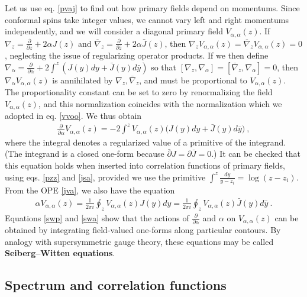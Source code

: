 \documentclass[12pt, a4paper, notitlepage, twoside]{report}
\numberwithin{equation}{section}
\theoremstyle{break}
\begin{document}
Let us use eq. \eqref{pvaj} to find out how primary fields depend on momentums. 
Since conformal spins take integer values, we cannot vary left and right momentums independently, and we will consider a diagonal primary field $V_{\alpha,\alpha}(z)$. 
If $\nabla_z={\frac{\partial}{\partial z}} +2\alpha J(z)$ and $\overline{\nabla}_{z}={\frac{\partial}{\partial \bar z}} +2\alpha \bar J(z)$, then $\nabla_z V_{\alpha,\alpha}(z)=\overline{\nabla}_z V_{\alpha,\alpha}(z)=0$, neglecting the issue of regularizing operator products.
If we then define $\nabla_\alpha = {\frac{\partial}{\partial \alpha}}+2\int^z (J(y)dy +\bar J(y)d\bar y)$ so that $[\nabla_z,\nabla_\alpha]=[\overline{\nabla}_z,\nabla_\alpha]=0$, then $\nabla_\alpha V_{\alpha,\alpha}(z)$ is annihilated by $\nabla_z,\overline{\nabla}_z$, and must be proportional to $V_{\alpha,\alpha}(z)$.
The proportionality constant can be set to zero by renormalizing the field $V_{\alpha,\alpha}(z)$, and this normalization coincides with the normalization which we adopted in eq. \eqref{vvoo}.
We thus obtain
\begin{align}
 {\frac{\partial}{\partial \alpha}} V_{\alpha,\alpha}(z) 
 = -2 \int^z V_{\alpha,\alpha}(z)\Big(J(y)dy+\bar J(y)d\bar y \Big)\ ,
\label{swp}
\end{align}
where the integral denotes a regularized value of a primitive of the integrand. (The integrand is a closed one-form because $\bar\partial J = \partial \bar J=0$.)
It can be checked that this equation holds when inserted into correlation functions of primary fields, using eqs. \eqref{pzz} and \eqref{jsa}, provided we use the primitive $\int^z \frac{dy}{y-z_i} = \log(z-z_i)$.
From the OPE \eqref{jva}, we also have the equation
\begin{align}
 \alpha V_{\alpha,\alpha}(z) 
 = \frac{1}{2\pi i} \oint_{z} V_{\alpha,\alpha}(z)J(y)dy
 = \frac{1}{2\pi i} \oint_{z} V_{\alpha,\alpha}(z)\bar J(y)d\bar y\ .
\label{swa}
\end{align}
Equations \eqref{swp} and \eqref{swa} show that the actions of ${\frac{\partial}{\partial \alpha}}$ and $\alpha$ on $V_{\alpha,\alpha}(z)$ can be obtained by integrating field-valued one-forms along particular contours.
By analogy with supersymmetric gauge theory, these equations may be called \textbf{\boldmath Seiberg--Witten equations}. 


\subsection{Spectrum and correlation functions \label{secsacf}}
\end{document}
